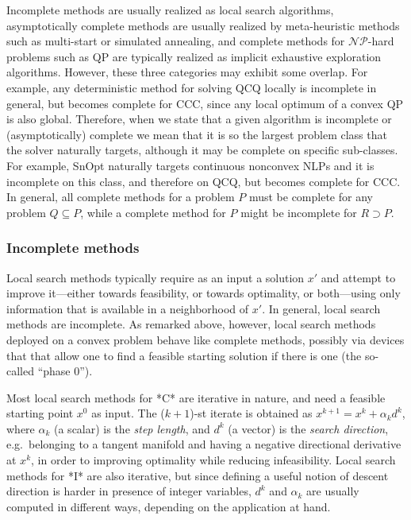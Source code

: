 Incomplete methods are usually realized as local search algorithms, asymptotically complete methods are usually realized by meta-heuristic methods such as multi-start or simulated annealing, and complete methods for $\mathcal{NP}$-hard problems such as QP are typically realized as implicit exhaustive exploration algorithms. However, these three categories may exhibit some overlap. For example, any deterministic method for solving QCQ locally is incomplete in general, but becomes complete for CCC, since any local optimum of a convex QP is also global. Therefore, when we state that a given algorithm is incomplete or (asymptotically) complete we mean that it is so the largest problem class that the solver naturally targets, although it may be complete on specific sub-classes. For example, {\sc SnOpt} naturally targets continuous nonconvex NLPs and it is incomplete on this class, and therefore on QCQ, but becomes complete for CCC. In general, all complete methods for a problem $P$ must be complete for any problem $Q \subseteq P$, while a complete method for $P$ might be incomplete for $R \supset P$. 


\subsubsection{Incomplete methods}\label{s:incomplete}

Local search methods typically require as an input a solution $x'$ and attempt to improve it---either towards feasibility, or towards optimality, or both---using only information that is available in a neighborhood of $x'$. In general, local search methods are incomplete. As remarked above, however, local search methods deployed on a convex problem behave like complete methods, possibly via devices that that allow one to find a feasible starting solution if there is one (the so-called ``phase 0'').

Most local search methods for *C* are iterative in nature, and need a feasible starting point $x^0$ as input. The ($k+1$)-st iterate is obtained as $x^{k+1} = x^k + \alpha_k d^k$, where $\alpha_k$ (a scalar) is the {\it step length}, and $d^k$ (a vector) is the {\it search direction}, e.g.~belonging to a tangent manifold and having a negative directional derivative at $x^k$, in order to improving optimality while reducing infeasibility. Local search methods for *I* are also iterative, but since defining a useful notion of descent direction is harder in presence of integer variables, $d^k$ and $\alpha_k$ are usually computed in different ways, depending on the application at hand. 

